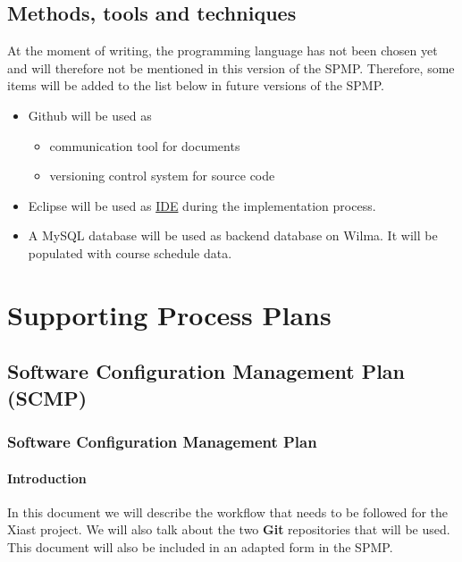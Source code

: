 \documentclass[9pt]{article}
\begin{document}
\subsection{Methods, tools and
techniques}\label{methods-tools-and-techniques}

At the moment of writing, the programming language has not been chosen
yet and will therefore not be mentioned in this version of the SPMP.
Therefore, some items will be added to the list below in future versions
of the SPMP.

\begin{itemize}
\itemsep1pt\parskip0pt
\item
  Github will be used as

  \begin{itemize}
  \itemsep1pt\parskip0pt
  \item
    communication tool for documents
  \item
    versioning control system for source code
  \end{itemize}
\item
  Eclipse will be used as \hyperref[IDE]{IDE} during the implementation
  process.
\item
  A MySQL database will be used as backend database on Wilma. It will be
  populated with course schedule data.
\end{itemize}

\section{Supporting Process Plans}\label{supporting-process-plans}

\subsection{Software Configuration Management Plan
(SCMP)}\label{software-configuration-management-plan-scmp}

\subsubsection{Software Configuration Management
Plan}\label{software-configuration-management-plan}

\paragraph{Introduction}\label{introduction}

In this document we will describe the workflow that needs to be followed
for the Xiast project. We will also talk about the two \textbf{Git}
repositories that will be used. This document will also be included in
an adapted form in the SPMP.
\end{document}
